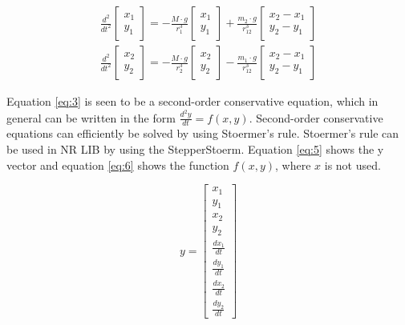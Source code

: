 \begin{equation}
\begin{align*}
\frac { { d }^{ 2 } }{ { dt }^{ 2 } } \left[ \begin{matrix} x_{ 1 } \\ y_{ 1 } \end{matrix} \right] =-\frac { M\cdot g }{ { r }^{ 3 }_{ 1 } } \left[ \begin{matrix} x_{ 1 } \\ y_{ 1 } \end{matrix} \right] +\frac { m_{ 2 }\cdot g }{ { r }^{ 3 }_{ 12 } } \left[ \begin{matrix} x_{ 2 }-x_{ 1 } \\ y_{ 2 }-y_{ 1 } \end{matrix} \right] \\ 
\frac { { d }^{ 2 } }{ { dt }^{ 2 } } \left[ \begin{matrix} x_{ 2 } \\ y_{ 2 } \end{matrix} \right] =-\frac { M\cdot g }{ { r }^{ 3 }_{ 2 } } \left[ \begin{matrix} x_{ 2 } \\ y_{ 2 } \end{matrix} \right] -\frac { m_{ 1 }\cdot g }{ { r }^{ 3 }_{ 12 } } \left[ \begin{matrix} x_{ 2 }-x_{ 1 } \\ y_{ 2 }-y_{ 1 } \end{matrix} \right] 
\end{align*}
\label{eq:3}
\end{equation}

Equation \ref{eq:3} is seen to be a second-order conservative equation, which in general can be written in the form $\frac { d^2y }{ dt } = f(x,y)$. Second-order conservative equations can efficiently be solved by using Stoermer’s rule. 
Stoermer’s rule can be used in NR LIB by using the StepperStoerm. 
Equation \ref{eq:5} shows the y vector and equation \ref{eq:6} shows the function $f(x,y)$, where $x$ is not used.

\begin{equation}
y=\left[ \begin{matrix} x_1\\ y_1\\ x_2\\ y_2\\ \frac { dx_1 }{ dt } \\ \frac { dy_1}{ dt } \\ \frac { dx_2}{ dt } \\ \frac { dy_2 }{ dt } \end{matrix}  \right]
\label{eq:5}
\end{equation}


